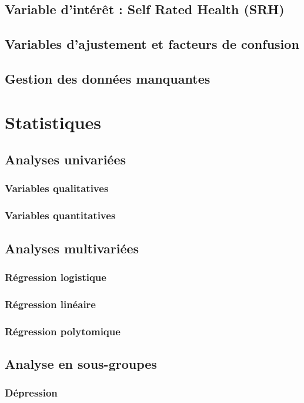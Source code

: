 \documentclass{book}
\begin{document}
\subsection{Variable d'intérêt : Self Rated Health (SRH)}
\subsection{Variables d'ajustement et facteurs de confusion}
\subsection{Gestion des données manquantes}

\newpage
\section{Statistiques}
\subsection{Analyses univariées}
\subsubsection{Variables qualitatives}
\subsubsection{Variables quantitatives}
\subsection{Analyses multivariées}
\subsubsection{Régression logistique}
\subsubsection{Régression linéaire}
\subsubsection{Régression polytomique}
\subsection{Analyse en sous-groupes}
\subsubsection{Dépression}
\end{document}
